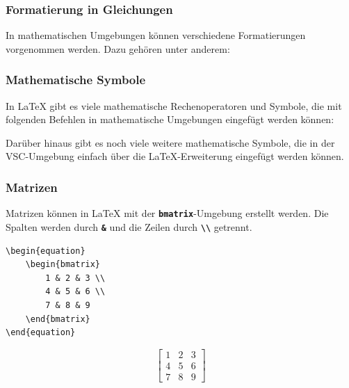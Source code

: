 \subsubsection{Formatierung in Gleichungen}
In mathematischen Umgebungen können verschiedene Formatierungen vorgenommen werden. Dazu gehören unter anderem:




\subsubsection{Mathematische Symbole}
In \LaTeX{} gibt es viele mathematische Rechenoperatoren und Symbole, die mit folgenden Befehlen in mathematische Umgebungen eingefügt werden können:



Darüber hinaus gibt es noch viele weitere mathematische Symbole, die in der VSC-Umgebung einfach über die \LaTeX{}-Erweiterung eingefügt werden können.

\subsubsection{Matrizen}
Matrizen können in \LaTeX{} mit der \textbf{\texttt{bmatrix}}-Umgebung erstellt werden. Die Spalten werden durch \textbf{\texttt{\&}} und die Zeilen durch \textbf{\texttt{\textbackslash\textbackslash}} getrennt.

\begin{minipage}{0.5\textwidth}
    \begin{lstlisting}[language={[LaTeX]TeX}]
\begin{equation}
    \begin{bmatrix}
        1 & 2 & 3 \\
        4 & 5 & 6 \\
        7 & 8 & 9
    \end{bmatrix}
\end{equation}
\end{lstlisting}
\end{minipage}
\hfill
\begin{minipage}{0.5\textwidth}
    \begin{equation}
        \begin{bmatrix}
            1 & 2 & 3 \\
            4 & 5 & 6 \\
            7 & 8 & 9
        \end{bmatrix}
    \end{equation}
\end{minipage}

